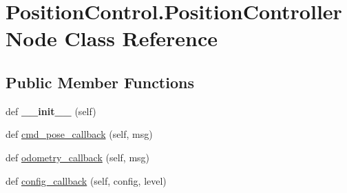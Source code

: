 \hypertarget{classPositionControl_1_1PositionControllerNode}{}\section{Position\+Control.\+Position\+Controller\+Node Class Reference}
\label{classPositionControl_1_1PositionControllerNode}
\subsection*{Public Member Functions}
\begin{DoxyCompactItemize}
\item 
\mbox{\label{classPositionControl_1_1PositionControllerNode_a996a74f89982afc15c512f8943738c31}} 
def {\bfseries \+\_\+\+\_\+init\+\_\+\+\_\+} (self)
\item 
def \hyperlink{classPositionControl_1_1PositionControllerNode_ac55340595848d176904ffd288557f315}{cmd\+\_\+pose\+\_\+callback} (self, msg)
\item 
def \hyperlink{classPositionControl_1_1PositionControllerNode_aa8a67e3bf22291ac2954fde652427037}{odometry\+\_\+callback} (self, msg)
\item 
def \hyperlink{classPositionControl_1_1PositionControllerNode_a28dae08a4d6942f9ffb0878e61c2cef6}{config\+\_\+callback} (self, config, level)
\end{DoxyCompactItemize}
